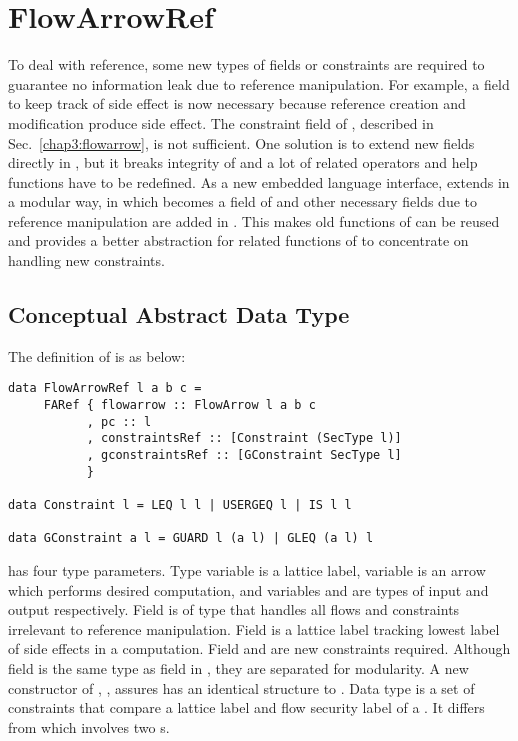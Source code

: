 
\section{FlowArrowRef}


To deal with reference, some new types of fields or constraints are required to
guarantee no information leak due to reference manipulation. For example, a field
to keep track of side effect is now necessary because reference creation and 
modification produce side effect. The constraint field of , 
described in Sec.~\ref{chap3:flowarrow}, is not sufficient. One solution is to extend new
fields directly in , but it breaks integrity of  and
a lot of related operators and help functions have to be redefined. 
As a new embedded language interface,  extends  in 
a modular way, in which  becomes a field of  and 
other necessary fields due to reference manipulation are added in . 
This makes old functions of  can be reused and provides a better 
abstraction for related functions of  to concentrate on handling
new constraints.

\subsection{Conceptual Abstract Data Type}
\label{chap3:flowarrowref:concept}
The definition of  is as below:
\begin{verbatim}
data FlowArrowRef l a b c = 
     FARef { flowarrow :: FlowArrow l a b c
           , pc :: l
           , constraintsRef :: [Constraint (SecType l)]
           , gconstraintsRef :: [GConstraint SecType l]
           }

data Constraint l = LEQ l l | USERGEQ l | IS l l 

data GConstraint a l = GUARD l (a l) | GLEQ (a l) l
\end{verbatim}
 has four type parameters. Type variable  is a lattice label,
variable  is an arrow which performs desired computation, and variables  
and  are types
of input and output respectively. Field  is of type  that
handles all flows and constraints irrelevant to reference manipulation. Field  
is a lattice label tracking lowest label of side effects in a computation. Field 
 and  are new constraints required. Although
field  is the same type as field  in ,
they are separated for modularity. A new constructor of ,
, assures  has an identical structure to . Data type 
 is a set of constraints that compare a lattice label and flow
security label of a . It differs from  which involves
two s.

